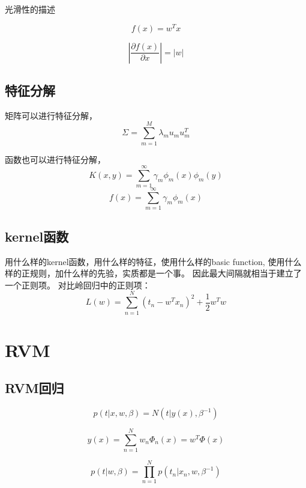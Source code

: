 光滑性的描述

\begin{equation}
f(x) = w^Tx
\end{equation}

\begin{equation}
|\frac{\partial f(x)}{\partial x}| = |w|
\end{equation}

\subsection{特征分解}
矩阵可以进行特征分解，
\begin{equation} 
\Sigma = \sum_{m=1}^M\lambda_mu_mu^T_m
\end{equation}

函数也可以进行特征分解，
\begin{equation} 
K(x, y) = \sum_{m=1}^\infty\gamma_m\phi_m(x)\phi_m(y)
\end{equation}
\begin{equation} 
f(x) = \sum_{m=1}^\infty\gamma_m\phi_m(x)
\end{equation}

\subsection{kernel函数}
用什么样的kernel函数，用什么样的特征，使用什么样的basic function,
使用什么样的正规则，加什么样的先验，实质都是一个事。
因此最大间隔就相当于建立了一个正则项。
对比岭回归中的正则项：
\begin{equation}
L(w) = \sum_{n=1}^N(t_n - w^Tx_n)^2 + \frac{1}{2}w^Tw
\end{equation}

\section{RVM}
\subsection{RVM回归}
\begin{equation}
p(t|x, w,\beta) = N(t|y(x),\beta^{-1})
\end{equation}

\begin{equation}
y(x) = \sum_{n=1}^Nw_n\Phi_n(x) = w^T\Phi(x)
\end{equation}

\begin{equation}
p(t|w,\beta) = \prod_{n=1}^Np(t_n|x_n, w, \beta^{-1})
\end{equation}

